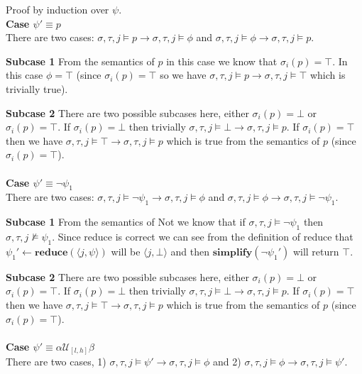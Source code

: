 \documentclass[10pt,a4paper]{article}
\newcommand{\rp}[2]{\ensuremath{\langle #1, #2 \rangle}}
\begin{document}
\noindent Proof by induction over $\psi$. \\

\noindent \textbf{Case $\psi' \equiv p$} \\
There are two cases: $\sigma, \tau, j \vDash p \rightarrow \sigma, \tau, j \vDash \phi$ and $\sigma,\tau,j\vDash \phi \rightarrow \sigma,\tau,j\vDash p$.

\textbf{Subcase 1}
From the semantics of $p$ in this case we know that $\sigma_i(p) = \top$. In this case $\phi = \top$ (since $\sigma_i(p) = \top$ so we have $\sigma,\tau,j\vDash p \rightarrow \sigma,\tau,j\vDash \top$ which is trivially true).

\textbf{Subcase 2}
There are two possible subcases here, either $\sigma_i(p) = \bot$ or $\sigma_i(p) = \top$. If $\sigma_i(p) = \bot$ then trivially $\sigma,\tau,j\vDash \bot \rightarrow \sigma,\tau,j\vDash p$. If $\sigma_i(p) = \top$ then we have $\sigma,\tau,j\vDash \top \rightarrow \sigma,\tau,j\vDash p$ which is true from the semantics of $p$ (since $\sigma_i(p) = \top$).
\\ \\
\noindent \textbf{Case $\psi' \equiv \neg \psi_1$} \\
There are two cases: $\sigma, \tau, j \vDash \neg \psi_1 \rightarrow \sigma, \tau, j \vDash \phi$ and $\sigma,\tau,j\vDash \phi \rightarrow \sigma,\tau,j\vDash \neg \psi_1$.

\textbf{Subcase 1}
From the semantics of Not we know that if $\sigma,\tau,j\vDash \neg \psi_1$ then $\sigma, \tau, j\nvDash \psi_1$. Since reduce is correct we can see from the definition of reduce that $\psi_1' \leftarrow \mathbf{reduce}(\rp{j}{\psi})$ will be $\rp{j}{\bot}$ and then $\mathbf{simplify}(\neg \psi_1')$ will return $\top$.

\textbf{Subcase 2}
There are two possible subcases here, either $\sigma_i(p) = \bot$ or $\sigma_i(p) = \top$. If $\sigma_i(p) = \bot$ then trivially $\sigma,\tau,j\vDash \bot \rightarrow \sigma,\tau,j\vDash p$. If $\sigma_i(p) = \top$ then we have $\sigma,\tau,j\vDash \top \rightarrow \sigma,\tau,j\vDash p$ which is true from the semantics of $p$ (since $\sigma_i(p) = \top$).
\\ \\
\noindent \textbf{Case $\psi' \equiv \alpha \mathcal{U}_{[l,h]} \beta$} \\
There are two cases, 1) $\sigma, \tau, j \vDash \psi' \rightarrow \sigma, \tau, j \vDash \phi$ and 2) $\sigma, \tau, j \vDash \phi \rightarrow \sigma, \tau, j \vDash \psi'$.
\end{document}
